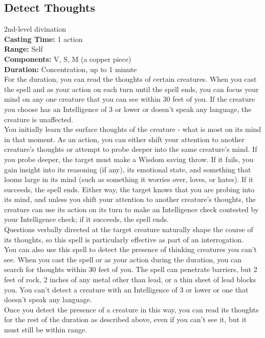 \documentclass[11pt, A4paper, english]{article}
\begin{document}
		\subsection{Detect Thoughts}
2nd-level divination \\
\textbf{Casting Time:} 1 action \\
\textbf{Range:} Self \\
\textbf{Components:} V, S, M (a copper piece) \\
\textbf{Duration:} Concentration, up to 1 minute \\
For the duration, you can read the thoughts of certain creatures. When you cast the spell and as your action on each turn until the spell ends, you can focus your mind on any one creature that you can see within 30 feet of you. If the creature you choose has an Intelligence of 3 or lower or doesn’t speak any language, the creature is unaffected. \\
You initially learn the surface thoughts of the creature - what is most on its mind in that moment. As an action, you can either shift your attention to another creature’s thoughts or attempt to probe deeper into the same creature’s mind. If you probe deeper, the target must make a Wisdom saving throw. If it fails, you gain insight into its reasoning (if any), its emotional state, and something that looms large in its mind (such as something it worries over, loves, or hates). If it succeeds, the spell ends. Either way, the target knows that you are probing into its mind, and unless you shift your attention to another creature’s thoughts, the creature can use its action on its turn to make an Intelligence check contested by your Intelligence check; if it succeeds, the spell ends. \\
Questions verbally directed at the target creature naturally shape the course of its thoughts, so this spell is particularly effective as part of an interrogation. \\
You can also use this spell to detect the presence of thinking creatures you can’t see. When you cast the spell or as your action during the duration, you can search for thoughts within 30 feet of you. The spell can penetrate barriers, but 2 feet of rock, 2 inches of any metal other than lead, or a thin sheet of lead blocks you. You can’t detect a creature with an Intelligence of 3 or lower or one that doesn’t speak any language. \\
Once you detect the presence of a creature in this way, you can read its thoughts for the rest of the duration as described above, even if you can’t see it, but it must still be within range.
\end{document}
